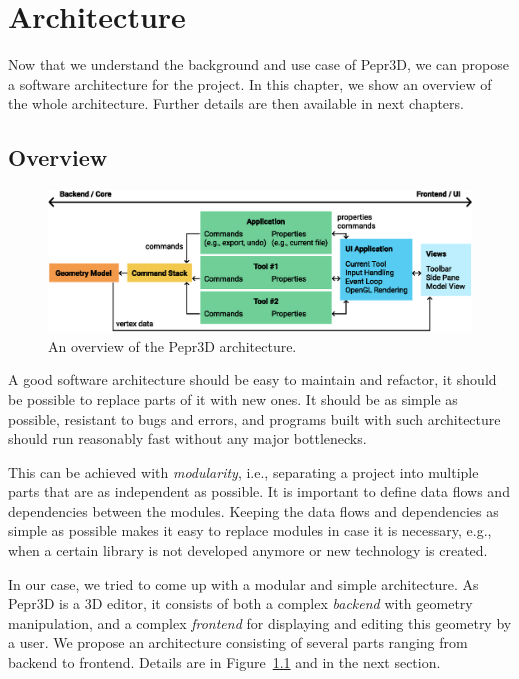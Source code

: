 \chapter{Architecture}

Now that we understand the background and use case of Pepr3D, we can propose a software architecture for the project.
In this chapter, we show an overview of the whole architecture.
Further details are then available in next chapters.

\section{Overview}

\begin{figure}[b]
	\centering
	\centerline{\includegraphics[scale=0.9]{images/architecture.eps}}
	\caption{An overview of the Pepr3D architecture.}
	\label{fig:architecture}
\end{figure}

A good software architecture should be easy to maintain and refactor, it should be possible to replace parts of it with new ones.
It should be as simple as possible, resistant to bugs and errors, and programs built with such architecture should run reasonably fast without any major bottlenecks.

This can be achieved with \emph{modularity}, i.e., separating a project into multiple parts that are as independent as possible.
It is important to define data flows and dependencies between the modules.
Keeping the data flows and dependencies as simple as possible makes it easy to replace modules in case it is necessary, e.g., when a certain library is not developed anymore or new technology is created.

\medskip

In our case, we tried to come up with a modular and simple architecture.
As Pepr3D is a 3D editor, it consists of both a complex \emph{backend} with geometry manipulation, and a complex \emph{frontend} for displaying and editing this geometry by a user.
We propose an architecture consisting of several parts ranging from backend to frontend. Details are in Figure~\ref{fig:architecture} and in the next section.

